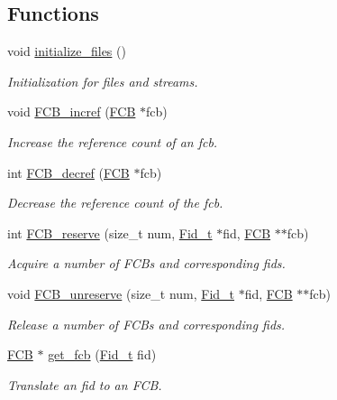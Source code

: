 \subsection*{Functions}
\begin{DoxyCompactItemize}
\item 
void \hyperlink{group__streams_ga147537248d983b0cc6cc7e8b39245f09}{initialize\+\_\+files} ()
\begin{DoxyCompactList}\small\item\em Initialization for files and streams. \end{DoxyCompactList}\item 
void \hyperlink{group__streams_ga409efca0b415dfdabe868c292d1daf66}{F\+C\+B\+\_\+incref} (\hyperlink{group__streams_ga0c7e751afb9d6cadebf070961804d400}{F\+CB} $\ast$fcb)
\begin{DoxyCompactList}\small\item\em Increase the reference count of an fcb. \end{DoxyCompactList}\item 
int \hyperlink{group__streams_ga26586eafc28dd1f2ac5bc7402922aa36}{F\+C\+B\+\_\+decref} (\hyperlink{group__streams_ga0c7e751afb9d6cadebf070961804d400}{F\+CB} $\ast$fcb)
\begin{DoxyCompactList}\small\item\em Decrease the reference count of the fcb. \end{DoxyCompactList}\item 
int \hyperlink{group__streams_ga462269376de145171b87b7bc3036e4f8}{F\+C\+B\+\_\+reserve} (size\+\_\+t num, \hyperlink{group__syscalls_ga5097222c5f0da97d92d4712359abc38f}{Fid\+\_\+t} $\ast$fid, \hyperlink{group__streams_ga0c7e751afb9d6cadebf070961804d400}{F\+CB} $\ast$$\ast$fcb)
\begin{DoxyCompactList}\small\item\em Acquire a number of F\+C\+Bs and corresponding fids. \end{DoxyCompactList}\item 
void \hyperlink{group__streams_gac44c094845a8d4e2e13f9df5b17274df}{F\+C\+B\+\_\+unreserve} (size\+\_\+t num, \hyperlink{group__syscalls_ga5097222c5f0da97d92d4712359abc38f}{Fid\+\_\+t} $\ast$fid, \hyperlink{group__streams_ga0c7e751afb9d6cadebf070961804d400}{F\+CB} $\ast$$\ast$fcb)
\begin{DoxyCompactList}\small\item\em Release a number of F\+C\+Bs and corresponding fids. \end{DoxyCompactList}\item 
\hyperlink{group__streams_ga0c7e751afb9d6cadebf070961804d400}{F\+CB} $\ast$ \hyperlink{group__streams_ga36b4f172aba29ba2660d0aed0f10d60b}{get\+\_\+fcb} (\hyperlink{group__syscalls_ga5097222c5f0da97d92d4712359abc38f}{Fid\+\_\+t} fid)
\begin{DoxyCompactList}\small\item\em Translate an fid to an F\+CB. \end{DoxyCompactList}\end{DoxyCompactItemize}


